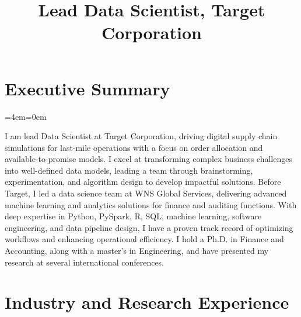 \documentclass[11pt,a4paper,]{moderncv}
\title{Lead Data Scientist, Target Corporation}
\begin{document}
\makecvtitle



\newenvironment{smallblockquote}{%
  \par%
  \medskip
  \leftskip=2em\rightskip=0em%
  \noindent\ignorespaces}{%
  \par\medskip}

\newenvironment{blockquote}{%
  \par%
  \medskip
  \leftskip=4em\rightskip=0em%
  \noindent\ignorespaces}{%
  \par\medskip}

\hypertarget{executive-summary}{%
\section{Executive Summary}\label{executive-summary}}

\begingroup
%
  \par%
  \medskip
  \leftskip=4em\rightskip=0em%
  \noindent\ignorespaces

I am lead Data Scientist at Target Corporation, driving digital supply chain simulations for last-mile operations with a focus on order allocation and available-to-promise models. I excel at transforming complex business challenges into well-defined data models, leading a team through brainstorming, experimentation, and algorithm design to develop impactful solutions. Before Target, I led a data science team at WNS Global Services, delivering advanced machine learning and analytics solutions for finance and auditing functions. With deep expertise in Python, PySpark, R, SQL, machine learning, software engineering, and data pipeline design, I have a proven track record of optimizing workflows and enhancing operational efficiency. I hold a Ph.D. in Finance and Accounting, along with a master's in Engineering, and have presented my research at several international conferences.

%
  \par\medskip
\endgroup

\hypertarget{industry-and-research-experience}{%
\section{Industry and Research
Experience}\label{industry-and-research-experience}}
\end{document}
